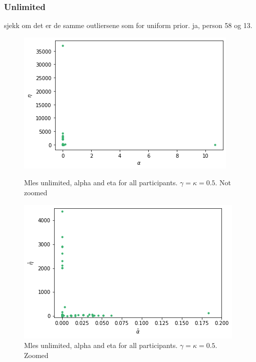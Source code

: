 \subsubsection{Unlimited}
sjekk om det er de samme outliersene som for uniform prior. ja, person 58 og 13. 
\begin{figure}
    \centering
    \begin{minipage}{0.48\textwidth}
        \centering
        \includegraphics[scale=0.37]{pictures/Gamma=kappa=0.5/plotted_mles_unlim_gk0.5.png}
        \caption{Mles unlimited, alpha and eta for all participants. $\gamma=\kappa=0.5$.    Not zoomed}
        \label{fig:gk0.5_mles_unlimited}
    \end{minipage}\hfill%
    \begin{minipage}{0.48\textwidth}
        \centering
        \includegraphics[scale=0.37]{pictures/Gamma=kappa=0.5/plotted_mles_unlim_gk0.5_zoomed.png}
        \caption{Mles unlimited, alpha and eta for all participants. $\gamma=\kappa=0.5$. Zoomed}
        \label{fig:gk0.5_mles_unlimited_zoomed}
    \end{minipage}
    \vfill
    \begin{minipage}{0.48\textwidth}

\end{minipage}
\end{figure}

